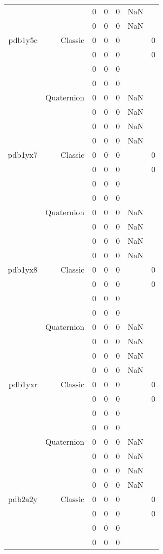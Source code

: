 \begin{xltabular}{\textwidth}{r|rcccSc}
& & 0 & 0 & 0 & NaN & \\
& & 0 & 0 & 0 & NaN & \\ \addlinespace
pdb1y5c & Classic & 0 & 0 & 0 & & 0 \\
& & 0 & 0 & 0 & & 0 \\
& & 0 & 0 & 0 & & \\
& & 0 & 0 & 0 & & \\
& Quaternion & 0 & 0 & 0 & NaN & \\
& & 0 & 0 & 0 & NaN & \\
& & 0 & 0 & 0 & NaN & \\
& & 0 & 0 & 0 & NaN & \\ \addlinespace
pdb1yx7 & Classic & 0 & 0 & 0 & & 0 \\
& & 0 & 0 & 0 & & 0 \\
& & 0 & 0 & 0 & & \\
& & 0 & 0 & 0 & & \\
& Quaternion & 0 & 0 & 0 & NaN & \\
& & 0 & 0 & 0 & NaN & \\
& & 0 & 0 & 0 & NaN & \\
& & 0 & 0 & 0 & NaN & \\ \addlinespace
pdb1yx8 & Classic & 0 & 0 & 0 & & 0 \\
& & 0 & 0 & 0 & & 0 \\
& & 0 & 0 & 0 & & \\
& & 0 & 0 & 0 & & \\
& Quaternion & 0 & 0 & 0 & NaN & \\
& & 0 & 0 & 0 & NaN & \\
& & 0 & 0 & 0 & NaN & \\
& & 0 & 0 & 0 & NaN & \\ \addlinespace
pdb1yxr & Classic & 0 & 0 & 0 & & 0 \\
& & 0 & 0 & 0 & & 0 \\
& & 0 & 0 & 0 & & \\
& & 0 & 0 & 0 & & \\
& Quaternion & 0 & 0 & 0 & NaN & \\
& & 0 & 0 & 0 & NaN & \\
& & 0 & 0 & 0 & NaN & \\
& & 0 & 0 & 0 & NaN & \\ \addlinespace
pdb2a2y & Classic & 0 & 0 & 0 & & 0 \\
& & 0 & 0 & 0 & & 0 \\
& & 0 & 0 & 0 & & \\
& & 0 & 0 & 0 & & \\

\end{xltabular}
